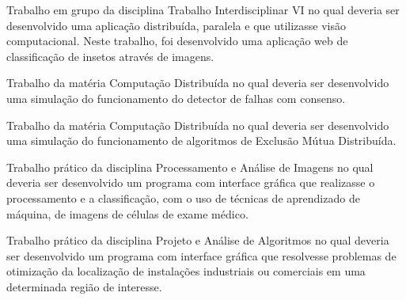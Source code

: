 \documentclass[10pt,a4paper,ragged2e,withhyper]{altacv}
\begin{document}
\begin{paracol}{2}
            Trabalho em grupo da disciplina Trabalho Interdisciplinar VI no qual deveria ser desenvolvido uma aplicação distribuída, paralela e que utilizasse visão computacional. Neste trabalho, foi desenvolvido uma aplicação web de classificação de insetos através de imagens.\\
            \divider

            Trabalho da matéria Computação Distribuída no qual deveria ser desenvolvido uma simulação do funcionamento do detector de falhas com consenso.\\
            \divider

            Trabalho da matéria Computação Distribuída no qual deveria ser desenvolvido uma simulação do funcionamento de algoritmos de Exclusão Mútua Distribuída.\\
            \divider

            Trabalho prático da disciplina Processamento e Análise de Imagens no qual deveria ser desenvolvido um programa com interface gráfica que realizasse o processamento e a classificação, com o uso de técnicas de aprendizado de máquina, de imagens de células de exame médico.\\
            \divider
            
            Trabalho prático da disciplina Projeto e Análise de Algoritmos no qual deveria ser desenvolvido um programa com interface gráfica que resolvesse problemas de otimização da localização de instalações industriais ou comerciais em uma determinada região de interesse.\\
            \divider


\end{paracol}
\end{document}
